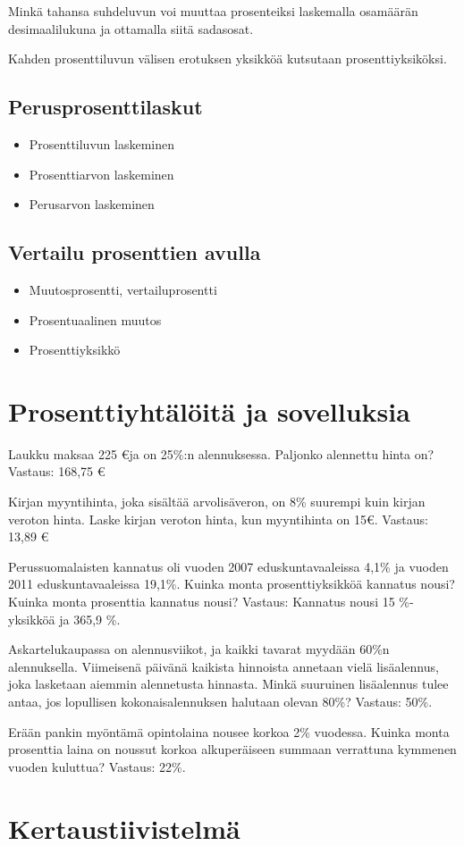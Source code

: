 Minkä tahansa suhdeluvun voi muuttaa prosenteiksi laskemalla osamäärän desimaalilukuna ja ottamalla siitä sadasosat.

Kahden prosenttiluvun välisen erotuksen yksikköä kutsutaan prosenttiyksiköksi.

\section{Perusprosenttilaskut}

\begin{itemize}
	\item Prosenttiluvun laskeminen
	\item Prosenttiarvon laskeminen
	\item Perusarvon laskeminen
\end{itemize}

\section{Vertailu prosenttien avulla}

\begin{itemize}
	\item Muutosprosentti, vertailuprosentti
	\item Prosentuaalinen muutos
	\item Prosenttiyksikkö
\end{itemize}

\chapter{Prosenttiyhtälöitä ja sovelluksia}

Laukku maksaa 225 \euro ja on 25\%:n alennuksessa. Paljonko alennettu hinta on?
Vastaus: 168,75 \euro

Kirjan myyntihinta, joka sisältää arvolisäveron, on 8\% suurempi kuin kirjan veroton hinta. Laske kirjan veroton hinta, kun myyntihinta on 15\euro.
Vastaus: 13,89 \euro

Perussuomalaisten kannatus oli vuoden 2007 eduskuntavaaleissa 4,1\% ja vuoden 2011 eduskuntavaaleissa 19,1\%. Kuinka monta prosenttiyksikköä kannatus nousi? Kuinka monta prosenttia kannatus nousi?
Vastaus: Kannatus nousi 15 \%-yksikköä ja 365,9 \%.

Askartelukaupassa on alennusviikot, ja kaikki tavarat myydään 60\%n alennuksella. Viimeisenä päivänä kaikista hinnoista annetaan vielä lisäalennus, joka lasketaan aiemmin alennetusta hinnasta. Minkä suuruinen lisäalennus tulee antaa, jos lopullisen kokonaisalennuksen halutaan olevan 80\%?
Vastaus: 50\%.

Erään pankin myöntämä opintolaina nousee korkoa 2\% vuodessa. Kuinka monta prosenttia laina on noussut korkoa alkuperäiseen summaan verrattuna kymmenen vuoden kuluttua?
Vastaus: 22\%.

%
%
\chapter{Kertaustiivistelmä}
